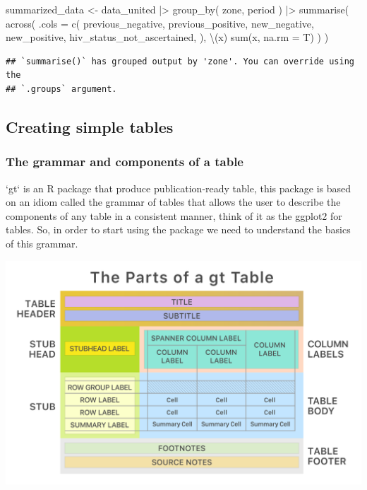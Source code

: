 \documentclass[
]{article}
\newenvironment{Shaded}{\begin{snugshade}}{\end{snugshade}}
\newcommand{\AttributeTok}[1]{\textcolor[rgb]{0.77,0.63,0.00}{#1}}
\newcommand{\FunctionTok}[1]{\textcolor[rgb]{0.00,0.00,0.00}{#1}}
\newcommand{\NormalTok}[1]{#1}
\newcommand{\OtherTok}[1]{\textcolor[rgb]{0.56,0.35,0.01}{#1}}
\newcommand{\SpecialCharTok}[1]{\textcolor[rgb]{0.00,0.00,0.00}{#1}}
\begin{document}
\begin{Shaded}
\begin{Highlighting}[]
\NormalTok{summarized\_data }\OtherTok{\textless{}{-}}\NormalTok{ data\_united }\SpecialCharTok{|\textgreater{}} 
  \FunctionTok{group\_by}\NormalTok{(}
\NormalTok{    zone,}
\NormalTok{    period}
\NormalTok{  ) }\SpecialCharTok{|\textgreater{}} 
  \FunctionTok{summarise}\NormalTok{(}
    \FunctionTok{across}\NormalTok{(}
      \AttributeTok{.cols =} \FunctionTok{c}\NormalTok{(}
\NormalTok{        previous\_negative, }
\NormalTok{        previous\_positive, }
\NormalTok{        new\_negative, }
\NormalTok{        new\_positive,}
\NormalTok{        hiv\_status\_not\_ascertained,  }
\NormalTok{      ),}
\NormalTok{      \textbackslash{}(x) }\FunctionTok{sum}\NormalTok{(x, }\AttributeTok{na.rm =}\NormalTok{ T) }
\NormalTok{    )}
\NormalTok{  )}
\end{Highlighting}
\end{Shaded}

\begin{verbatim}
## `summarise()` has grouped output by 'zone'. You can override using the
## `.groups` argument.
\end{verbatim}

\hypertarget{creating-simple-tables}{%
\subsection{Creating simple tables}\label{creating-simple-tables}}

\hypertarget{the-grammar-and-components-of-a-table}{%
\subsubsection{The grammar and components of a
table}\label{the-grammar-and-components-of-a-table}}

`gt` is an R package that produce publication-ready table, this package
is based on an idiom called the grammar of tables that allows the user
to describe the components of any table in a consistent manner, think of
it as the ggplot2 for tables. So, in order to start using the package we
need to understand the basics of this grammar.

\includegraphics{images/gt_parts_of_a_table.svg}
\end{document}
